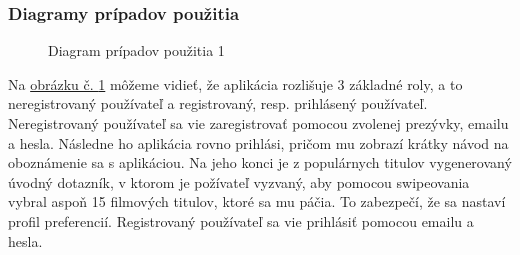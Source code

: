 \subsubsection{Diagramy prípadov použitia}
\begin{figure}[hbt!]
  \centering  
  \def\stackalignment{c}
           {\scriptsize}
	\caption{Diagram prípadov použitia 1}
	\label{usecase1}
\end{figure}

Na \hyperref[usecase1]{obrázku č. \ref{usecase1}} môžeme vidieť, že aplikácia rozlišuje 3 základné roly, a to neregistrovaný používateľ a registrovaný, resp. prihlásený používateľ. Neregistrovaný používateľ sa vie zaregistrovať pomocou zvolenej prezývky, emailu a hesla. Následne ho aplikácia rovno prihlási, pričom mu zobrazí krátky návod na oboznámenie sa s aplikáciou. Na jeho konci je z populárnych titulov vygenerovaný úvodný dotazník, v ktorom je požívateľ vyzvaný, aby pomocou swipeovania vybral aspoň 15 filmových titulov, ktoré sa mu páčia. To zabezpečí, že sa nastaví profil preferencií. Registrovaný používateľ sa vie prihlásiť pomocou emailu a hesla.
\pagebreak

